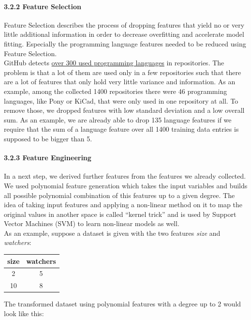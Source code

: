 \documentclass{article}
\begin{document}
\paragraph{3.2.2 Feature Selection}\label{feature-selection}

Feature Selection describes the process of dropping features that yield
no or very little additional information in order to decrease
overfitting and accelerate model fitting. Especially the programming
language features needed to be reduced using Feature Selection.\\
GitHub detects
\href{https://github.com/github/linguist/blob/master/lib/linguist/languages.yml}{over
300 used programming languages} in repositories. The problem is that a
lot of them are used only in a few repositories such that there are a
lot of features that only hold very little variance and information. As
an example, among the collected 1400 repositories there were 46
programming languages, like Pony or KiCad, that were only used in one
repository at all. To remove those, we dropped features with low
standard deviation and a low overall sum. As an example, we are already
able to drop 135 language features if we require that the sum of a
language feature over all 1400 training data entries is supposed to be
bigger than 5.

\paragraph{3.2.3 Feature Engineering}\label{feature-engineering}

In a next step, we derived further features from the features we already
collected. We used polynomial feature generation which takes the input
variables and builds all possible polynomial combination of this
features up to a given degree. The idea of taking input features and
applying a non-linear method on it to map the original values in another
space is called ``kernel trick'' and is used by Support Vector Machines
(SVM) to learn non-linear models as well.\\
As an example, suppose a dataset is given with the two features
\emph{size} and \emph{watchers}:

\begin{longtable}[]{@{}cc@{}}
\toprule
size & watchers\tabularnewline
\midrule
\endhead
2 & 5\tabularnewline
10 & 8\tabularnewline
\bottomrule
\end{longtable}

The transformed dataset using polynomial features with a degree up to 2
would look like this:
\end{document}

